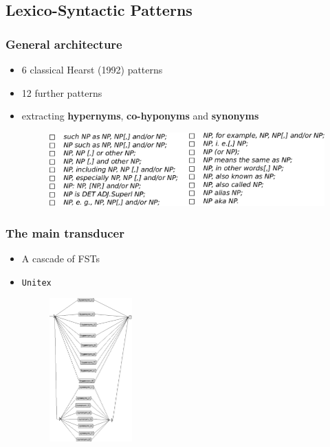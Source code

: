 \documentclass{beamer}
\begin{document}
\subsection{Lexico-Syntactic Patterns}

\begin{frame}
\frametitle{General architecture}

\begin{itemize}
  \item 6 classical Hearst (1992) patterns 
  \item 12 further patterns 
  \item extracting \textbf{hypernyms}, \textbf{co-hyponyms} and \textbf{synonyms}
\begin{figure}	
	\centering
		\includegraphics[width=1.0\textwidth]{figures/patterns}
	\end{figure}
\end{itemize}

\end{frame}

\begin{frame}
\frametitle{The main transducer}

\begin{itemize}
  \item A cascade of FSTs
  \item \texttt{Unitex}
\begin{figure}	
	\centering
		\includegraphics[width=0.3\textwidth]{figures/main-graph}
	\end{figure}
\end{itemize}

\end{frame}
\end{document}
